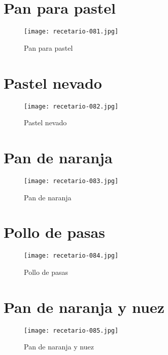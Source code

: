 \documentclass[12pt,letterpaper]{article}
\begin{document}
\newpage

\section{Pan para pastel}
  \begin{figure}[H]
    \vspace{2pt}
  \texttt{[image: recetario-081.jpg]}
    \caption{Pan para pastel}
    
  \end{figure}

\newpage

\section{Pastel nevado}
  \begin{figure}[H]
    \vspace{2pt}
  \texttt{[image: recetario-082.jpg]}
    \caption{Pastel nevado}
    
  \end{figure}

\newpage

\section{Pan de naranja}
  \begin{figure}[H]
    \vspace{2pt}
  \texttt{[image: recetario-083.jpg]}
    \caption{Pan de naranja}
    
  \end{figure}

\newpage

\section{Pollo de pasas}
  \begin{figure}[H]
    \vspace{2pt}
  \texttt{[image: recetario-084.jpg]}
    \caption{Pollo de pasas}
    
  \end{figure}

\newpage

\section{Pan de naranja y nuez}
  \begin{figure}[H]
    \vspace{2pt}
  \texttt{[image: recetario-085.jpg]}
    \caption{Pan de naranja y nuez}
    
  \end{figure}
\end{document}
